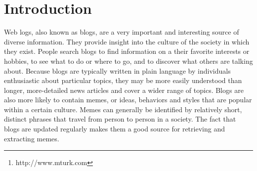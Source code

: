 \documentclass{sig-alternate}
\begin{document}
\maketitle
\begin{abstract}

With the recent development of Web 2.0 technologies and the concamitant explosion of user-generated content has come an incredible wealth of textual data whose form and content demand new strategies for text retrieval and classification.  In this paper we will describe our approach for extracting phrases that potentially allude to ideas, behaviors or styles that spread from person to person within a culture, collectively known as memes, from a large corpus of blog data.  In addition to phrase extraction, we use the canopy clustering approach \cite{McCallum2000} with a modified coefficent to group similar phrases.  Two Amazon Mechanical Turk\footnote{http://www.mturk.com} jobs are used to measure the likelihood that the clusters constitute a meme, and these data are used to build feature sets for supervising two support vector machines to classify the remaining clusters.

\end{abstract}




\section{Introduction}

Web logs, also known as blogs, are a very important and interesting source of diverse information. They provide insight into the culture of the society in which they exist. People search blogs to find information on a their favorite interests or hobbies, to see what to do or where to go, and to discover what others are talking about. Because blogs are typically written in plain language by individuals enthusiastic about particular topics, they may be more easily understood than longer, more-detailed news articles and cover a wider range of topics. Blogs are also more likely to contain memes, or ideas, behaviors and styles that are popular within a certain culture. Memes can generally be identified by relatively short, distinct phrases that travel from person to person in a society.  The fact that blogs are updated regularly makes them a good source for retrieving and extracting memes.
\end{document}
